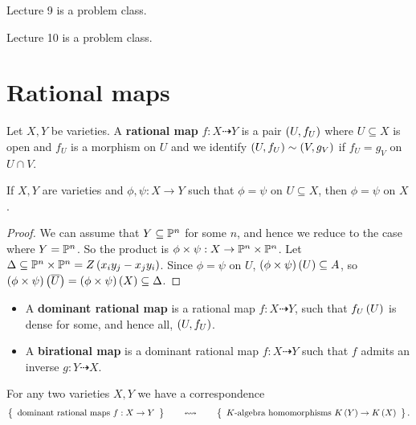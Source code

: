 
Lecture 9 is a problem class.


Lecture 10 is a problem class.

\pagebreak

\section{Rational maps}


\begin{definition}
Let $ X, Y $ be varieties. A \textbf{rational map} $ f : X \dashrightarrow Y $ is a pair $ \rb{U, f_U} $ where $ U \subseteq X $ is open and $ f_U $ is a morphism on $ U $ and we identify $ \rb{U, f_U} \sim \rb{V, g_V} $ if $ f_U = g_V $ on $ U \cap V $.
\end{definition}

\begin{lemma}
If $ X, Y $ are varieties and $ \phi, \psi : X \to Y $ such that $ \phi = \psi $ on $ U \subseteq X $, then $ \phi = \psi $ on $ X $.
\end{lemma}

\begin{proof}
We can assume that $ Y \subseteq \P^n $ for some $ n $, and hence we reduce to the case where $ Y = \P^n $. So the product is $ \phi \times \psi : X \to \P^n \times \P^n $. Let $ \Delta \subseteq \P^n \times \P^n = Z\rb{x_iy_j - x_jy_i} $. Since $ \phi = \psi $ on $ U $, $ \rb{\phi \times \psi}\rb{U} \subseteq A $, so $ \rb{\phi \times \psi}\rb{\overline{U}} = \rb{\phi \times \psi}\rb{X} \subseteq \Delta $.
\end{proof}

\begin{definition}
\hfill
\begin{itemize}
\item A \textbf{dominant rational map} is a rational map $ f : X \dashrightarrow Y $, such that $ f_U\rb{U} $ is dense for some, and hence all, $ \rb{U, f_U} $.
\item A \textbf{birational map} is a dominant rational map $ f : X \dashrightarrow Y $ such that $ f $ admits an inverse $ g : Y \dashrightarrow X $.
\end{itemize}
\end{definition}

\begin{theorem}
For any two varieties $ X, Y $ we have a correspondence
$$ \correspondence{\text{dominant rational maps} \ f : X \to Y}{K \text{-algebra homomorphisms} \ K\rb{Y} \to K\rb{X}}. $$
\end{theorem}

